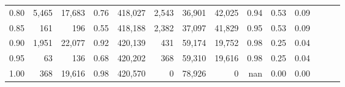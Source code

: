 \begin{tabular}{rrrrrrrrrrrrrr}
0.80 &   5,465 &  17,683 &  0.76 &  418,027 &    2,543 &  36,901 &  42,025 &  0.94 &  0.53 &      0.09 \\
0.85 &     161 &     196 &  0.55 &  418,188 &    2,382 &  37,097 &  41,829 &  0.95 &  0.53 &      0.09 \\
0.90 &   1,951 &  22,077 &  0.92 &  420,139 &      431 &  59,174 &  19,752 &  0.98 &  0.25 &      0.04 \\
0.95 &      63 &     136 &  0.68 &  420,202 &      368 &  59,310 &  19,616 &  0.98 &  0.25 &      0.04 \\
1.00 &     368 &  19,616 &  0.98 &  420,570 &        0 &  78,926 &       0 &   nan &  0.00 &      0.00 \\
\bottomrule
\end{tabular}
